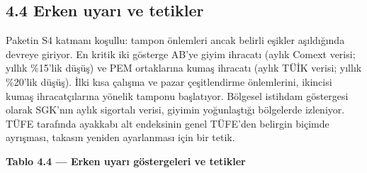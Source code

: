\hypertarget{nace_kartlar_13-15-44-erken-uyarux131-ve-tetikler}{%
\subsection{4.4 Erken uyarı ve tetikler}\label{nace_kartlar_13-15-44-erken-uyarux131-ve-tetikler}}

Paketin S4 katmanı koşullu: tampon önlemleri ancak belirli eşikler aşıldığında devreye giriyor. En kritik iki gösterge AB'ye giyim ihracatı (aylık Comext verisi; yıllık \%15'lik düşüş) ve PEM ortaklarına kumaş ihracatı (aylık TÜİK verisi; yıllık \%20'lik düşüş). İlki kısa çalışma ve pazar çeşitlendirme önlemlerini, ikincisi kumaş ihracatçılarına yönelik tamponu başlatıyor. Bölgesel istihdam göstergesi olarak SGK'nın aylık sigortalı verisi, giyimin yoğunlaştığı bölgelerde izleniyor. TÜFE tarafında ayakkabı alt endeksinin genel TÜFE'den belirgin biçimde ayrışması, takasın yeniden ayarlanması için bir tetik.


\textbf{Tablo 4.4 --- Erken uyarı göstergeleri ve tetikler}

\nopagebreak[4]

\begingroup\gbtablo\small

